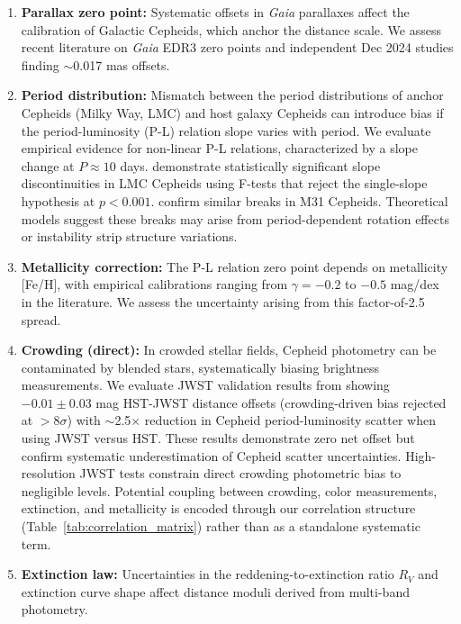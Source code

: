 \documentclass[preprint, linenumbers]{aastex701}
\begin{document}
\begin{enumerate}
\item \textbf{Parallax zero point:} Systematic offsets in \textit{Gaia} parallaxes affect the calibration of Galactic Cepheids, which anchor the distance scale. We assess recent literature on \textit{Gaia} EDR3 zero points \citep{Lindegren2021} and independent Dec 2024 studies finding $\sim$0.017 mas offsets.

\item \textbf{Period distribution:} Mismatch between the period distributions of anchor Cepheids (Milky Way, LMC) and host galaxy Cepheids can introduce bias if the period-luminosity (P-L) relation slope varies with period. We evaluate empirical evidence for non-linear P-L relations, characterized by a slope change at $P \approx 10$ days. \citet{Ngeow2006} demonstrate statistically significant slope discontinuities in LMC Cepheids using F-tests that reject the single-slope hypothesis at $p < 0.001$. \citet{Kodric2015} confirm similar breaks in M31 Cepheids. Theoretical models suggest these breaks may arise from period-dependent rotation effects \citep{Anderson2016} or instability strip structure variations.

\item \textbf{Metallicity correction:} The P-L relation zero point depends on metallicity [Fe/H], with empirical calibrations ranging from $\gamma = -0.2$ to $-0.5$ mag/dex in the literature. We assess the uncertainty arising from this factor-of-2.5 spread.

\item \textbf{Crowding (direct):} In crowded stellar fields, Cepheid photometry can be contaminated by blended stars, systematically biasing brightness measurements. We evaluate JWST validation results from \citet{Riess2024JWST} showing $-0.01 \pm 0.03$ mag HST-JWST distance offsets (crowding-driven bias rejected at $>8\sigma$) with $\sim$2.5$\times$ reduction in Cepheid period-luminosity scatter when using JWST versus HST. These results demonstrate zero net offset but confirm systematic underestimation of Cepheid scatter uncertainties. High-resolution JWST tests constrain direct crowding photometric bias to negligible levels. Potential coupling between crowding, color measurements, extinction, and metallicity is encoded through our correlation structure (Table~\ref{tab:correlation_matrix}) rather than as a standalone systematic term.

\item \textbf{Extinction law:} Uncertainties in the reddening-to-extinction ratio $R_V$ and extinction curve shape affect distance moduli derived from multi-band photometry.


\end{enumerate}
\end{document}
